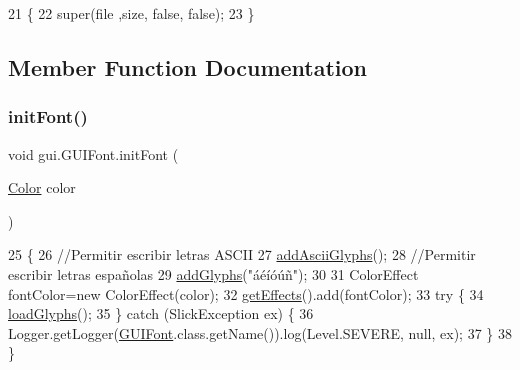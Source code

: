 \begin{DoxyCode}
21                                                                \{
22         super(file ,size, \textcolor{keyword}{false}, \textcolor{keyword}{false});
23     \}
\end{DoxyCode}


\subsection{Member Function Documentation}
\mbox{\label{classgui_1_1_g_u_i_font_ae1fccb6783e7c0f11fdcedd36362585d}} 
\subsubsection{\texorpdfstring{init\+Font()}{initFont()}\hspace{0.1cm}{\footnotesize\ttfamily [1/2]}}
{\footnotesize\ttfamily void gui.\+G\+U\+I\+Font.\+init\+Font (\begin{DoxyParamCaption}\item[{\mbox{\hyperlink{classorg_1_1newdawn_1_1slick_1_1_color}{Color}}}]{color }\end{DoxyParamCaption})\hspace{0.3cm}{\ttfamily [inline]}}


\begin{DoxyCode}
25                                      \{
26         \textcolor{comment}{//Permitir escribir letras ASCII}
27         \mbox{\hyperlink{classorg_1_1newdawn_1_1slick_1_1_unicode_font_aff50fdcbd957c6141d24dd877105110c}{addAsciiGlyphs}}();
28         \textcolor{comment}{//Permitir escribir letras españolas}
29         \mbox{\hyperlink{classorg_1_1newdawn_1_1slick_1_1_unicode_font_a54603f9fb72e1339e669be73d08a3963}{addGlyphs}}(\textcolor{stringliteral}{"áéíóúñ"});
30         
31         ColorEffect fontColor=\textcolor{keyword}{new} ColorEffect(color);
32         \mbox{\hyperlink{classorg_1_1newdawn_1_1slick_1_1_unicode_font_a939775feafa7099e8631da5ef44ee28c}{getEffects}}().add(fontColor);
33         \textcolor{keywordflow}{try} \{
34             \mbox{\hyperlink{classorg_1_1newdawn_1_1slick_1_1_unicode_font_abf14d8ad33f80b66e14990417bd04088}{loadGlyphs}}();
35         \} \textcolor{keywordflow}{catch} (SlickException ex) \{
36             Logger.getLogger(\mbox{\hyperlink{classgui_1_1_g_u_i_font_a5d39053888fa6b4733bc8b8c79a569c9}{GUIFont}}.class.getName()).log(Level.SEVERE, null, ex);
37         \}
38     \}
\end{DoxyCode}
\mbox{\label{classgui_1_1_g_u_i_font_a9574a15bcf70de6646aa6f5c51ea2d5a}} 
